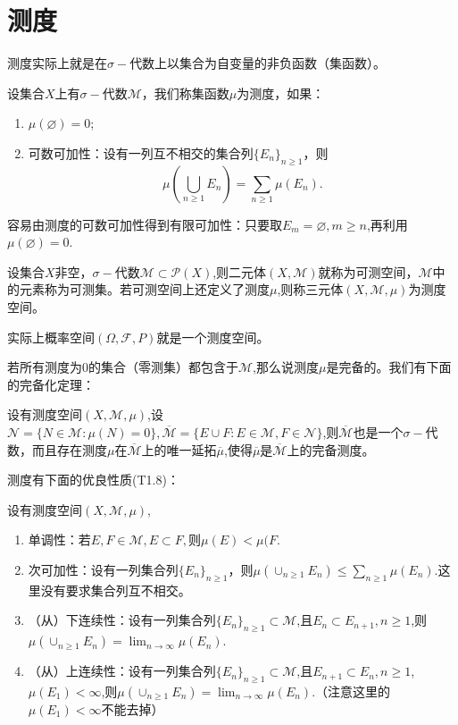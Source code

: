 \documentclass[lang=cn,10pt]{elegantbook}
\begin{document}
	\section{测度}
	测度实际上就是在\(\sigma-\)代数上以集合为自变量的非负函数（集函数）。
	\begin{definition}[测度]
		设集合\(X\)上有\(\sigma-\)代数\(\mathcal{M}\)，我们称集函数\(\mu\)为测度，如果：
		\begin{enumerate}
			\item \(\mu(\varnothing)=0\);
			\item 可数可加性：设有一列互不相交的集合列\(\{E_n\}_{n\ge 1}\)，则
			\[\mu(\bigcup_{n\ge 1}E_n)=\sum_{n\ge 1}\mu(E_n).\]
		\end{enumerate}
	\end{definition}
	容易由测度的可数可加性得到有限可加性：只要取\(E_m=\varnothing,m\ge n\),再利用\(\mu(\varnothing)=0\).
	\begin{definition}[测度空间]
		设集合\(X\)非空，\(\sigma-\)代数\(\mathcal{M}\subset \mathcal{P}(X)\),则二元体\((X,\mathcal{M})\)就称为可测空间，\(\mathcal{M}\)中的元素称为可测集。若可测空间上还定义了测度\(\mu\),则称三元体\((X,\mathcal{M},\mu)\)为测度空间。
	\end{definition}
	\begin{note}
		实际上概率空间\((\Omega,\mathcal{F},P)\)就是一个测度空间。
	\end{note}
	若所有测度为0的集合（零测集）都包含于\(\mathcal{M}\),那么说测度\(\mu\)是完备的。我们有下面的完备化定理：
	\begin{theorem}[完备化][T1.9]
		设有测度空间\((X,\mathcal{M},\mu)\),设\(\mathcal{N}=\{N\in\mathcal{M}:\mu(N)=0\},\overline{\mathcal{M}}=\{E\cup F:E\in \mathcal{M},F\in \mathcal{N}\}\),则\(\overline{\mathcal{M}}\)也是一个\(\sigma-\)代数，而且存在测度\(\mu\)在\(\overline{\mathcal{M}}\)上的唯一延拓\(\overline{\mu}\),使得\(\overline{\mu}\)是\(\overline{\mathcal{M}}\)上的完备测度。
	\end{theorem}
	测度有下面的优良性质(T1.8)：
	\begin{property}
		设有测度空间\((X,\mathcal{M},\mu)\),
		\begin{enumerate}
			\item 单调性：若\(E,F\in \mathcal{M},E\subset F,\)则\(\mu(E)<\mu(F\).
			\item 次可加性：设有一列集合列\(\{E_n\}_{n\ge 1}\)，则\(\mu(\cup_{n\ge 1}E_n)\le \sum_{n\ge 1}\mu(E_n)\).这里没有要求集合列互不相交。
			\item （从）下连续性：设有一列集合列\(\{E_n\}_{n\ge 1}\subset \mathcal{M}\),且\(E_n\subset E_{n+1},n\ge 1\),则\(\mu(\cup_{n\ge 1}E_n)= \lim_{n\to \infty}\mu(E_n)\).
			\item （从）上连续性：设有一列集合列\(\{E_n\}_{n\ge 1}\subset \mathcal{M}\),且\(E_{n+1}\subset E_{n},n\ge 1\),\(\mu(E_1)<\infty\),则\(\mu(\cup_{n\ge 1}E_n)= \lim_{n\to \infty}\mu(E_n)\).（注意这里的\(\mu(E_1)<\infty\)不能去掉）
		\end{enumerate}
	\end{property}
\end{document}

